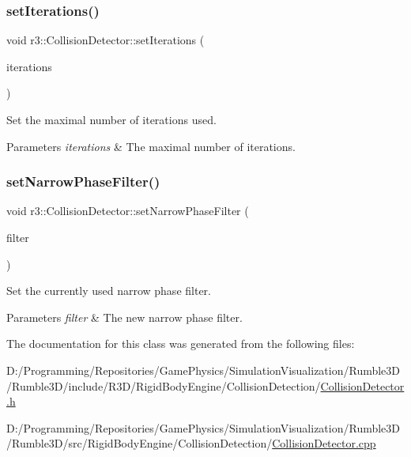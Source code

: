 \subsubsection{\texorpdfstring{set\+Iterations()}{setIterations()}}
{\footnotesize\ttfamily void r3\+::\+Collision\+Detector\+::set\+Iterations (\begin{DoxyParamCaption}\item[{int}]{iterations }\end{DoxyParamCaption})}



Set the maximal number of iterations used. 


\begin{DoxyParams}{Parameters}
{\em iterations} & The maximal number of iterations. \\
\hline
\end{DoxyParams}
\mbox{\label{classr3_1_1_collision_detector_a98f6ab749622d7fcffbdc0dcf59cfa75}} 
\subsubsection{\texorpdfstring{set\+Narrow\+Phase\+Filter()}{setNarrowPhaseFilter()}}
{\footnotesize\ttfamily void r3\+::\+Collision\+Detector\+::set\+Narrow\+Phase\+Filter (\begin{DoxyParamCaption}\item[{\mbox{\hyperlink{classr3_1_1_collision_detector_a094cc287cba14d5a063cfca41e667008}{Narrow\+Phase\+Filter\+\_\+\+Ptr}}}]{filter }\end{DoxyParamCaption})}



Set the currently used narrow phase filter. 


\begin{DoxyParams}{Parameters}
{\em filter} & The new narrow phase filter. \\
\hline
\end{DoxyParams}


The documentation for this class was generated from the following files\+:\begin{DoxyCompactItemize}
\item 
D\+:/\+Programming/\+Repositories/\+Game\+Physics/\+Simulation\+Visualization/\+Rumble3\+D/\+Rumble3\+D/include/\+R3\+D/\+Rigid\+Body\+Engine/\+Collision\+Detection/\mbox{\hyperlink{_collision_detector_8h}{Collision\+Detector.\+h}}\item 
D\+:/\+Programming/\+Repositories/\+Game\+Physics/\+Simulation\+Visualization/\+Rumble3\+D/\+Rumble3\+D/src/\+Rigid\+Body\+Engine/\+Collision\+Detection/\mbox{\hyperlink{_collision_detector_8cpp}{Collision\+Detector.\+cpp}}\end{DoxyCompactItemize}
